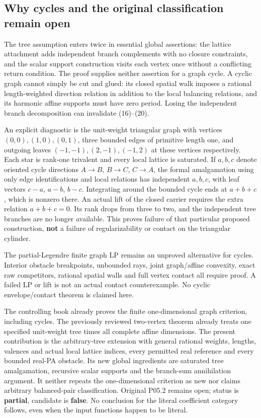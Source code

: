 \documentclass[
  11pt,
]{article}
\begin{document}
\subsection{Why cycles and the original classification remain
open}\label{why-cycles-and-the-original-classification-remain-open}

The tree assumption enters twice in essential global assertions: the
lattice attachment adds independent branch complements with no closure
constraints, and the scalar support construction visits each vertex once
without a conflicting return condition. The proof supplies neither
assertion for a graph cycle. A cyclic graph cannot simply be cut and
glued: its closed spatial walk imposes a rational length-weighted
direction relation in addition to the local balancing relations, and its
harmonic affine supports must have zero period. Losing the independent
branch decomposition can invalidate (16)--(20).

An explicit diagnostic is the unit-weight triangular graph with vertices
\((0,0),(1,0),(0,1)\), three bounded edges of primitive length one, and
outgoing leaves \((-1,-1),(2,-1),(-1,2)\) at these vertices
respectively. Each star is rank-one trivalent and every local lattice is
saturated. If \(a,b,c\) denote oriented cycle directions \(A\to B\),
\(B\to C\), \(C\to A\), the formal amalgamation using only edge
identifications and local relations has independent \(a,b,c\), with leaf
vectors \(c-a\), \(a-b\), \(b-c\). Integrating around the bounded cycle
ends at \(a+b+c\), which is nonzero there. An actual lift of the closed
carrier requires the extra relation \(a+b+c=0\). Its rank drops from
three to two, and the independent tree branches are no longer available.
This proves failure of that particular proposed construction,
\textbf{not} a failure of regularizability or contact on the triangular
cylinder.

The partial-Legendre finite graph LP remains an unproved alternative for
cycles. Interior obstacle breakpoints, unbounded rays, joint
graph/affine convexity, exact raw competitors, rational spatial walls
and full vertex contact all require proof. A failed LP or lift is not an
actual contact counterexample. No cyclic envelope/contact theorem is
claimed here.

The controlling book already proves the finite one-dimensional graph
criterion, including cycles. The previously reviewed two-vertex theorem
already treats one specified unit-weight tree times all complete affine
dimensions. The present contribution is the arbitrary-tree extension
with general rational weights, lengths, valences and actual local
lattice indices, every permitted real reference and every bounded
real-PA obstacle. Its new global ingredients are saturated tree
amalgamation, recursive scalar supports and the branch-sum annihilation
argument. It neither repeats the one-dimensional criterion as new nor
claims arbitrary balanced-pair classification. Original P05.2 remains
open; status is \textbf{partial}, candidate is \textbf{false}. No
conclusion for the literal coefficient category follows, even when the
input functions happen to be literal.
\end{document}

